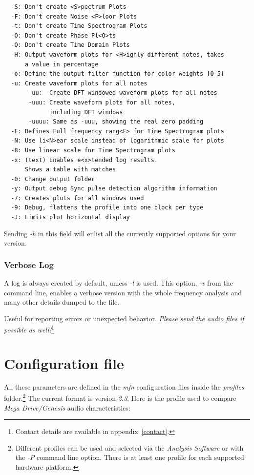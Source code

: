 \documentclass[10pt,a4paper]{report}
\begin{document}
\begin{appendices}
\begin{verbatim}
  -S: Don't create <S>pectrum Plots
  -F: Don't create Noise <F>loor Plots
  -t: Don't create Time Spectrogram Plots
  -O: Don't create Phase Pl<O>ts
  -Q: Don't create Time Domain Plots
  -H: Output waveform plots for <H>ighly different notes, takes
      a value in percentage
  -o: Define the output filter function for color weights [0-5]
  -u: Create waveform plots for all notes
       -uu:  Create DFT windowed waveform plots for all notes
       -uuu: Create waveform plots for all notes,
             including DFT windows
       -uuuu: Same as -uuu, showing the real zero padding
  -E: Defines Full frequency rang<E> for Time Spectrogram plots
  -N: Use li<N>ear scale instead of logarithmic scale for plots
  -8: Use linear scale for Time Spectrogram plots
  -x: (text) Enables e<x>tended log results.
      Shows a table with matches
  -0: Change output folder
  -y: Output debug Sync pulse detection algorithm information
  -7: Creates plots for all windows used
  -9: Debug, flattens the profile into one block per type
  -J: Limits plot horizontal display
\end{verbatim}

Sending \textit{-h} in this field will enlist all the currently supported options for your version.

\subsection{Verbose Log}
\label{verbose}

A log is always created by default, unless \textit{-l} is used. This option, \textit{-v} from the command line, enables a verbose version with the whole frequency analysis and many other details dumped to the file. 

Useful for reporting errors or unexpected behavior. \textit{Please send the audio files if possible as well!}\footnote{Contact details are available in appendix~\ref{contact}.}
	
\chapter{Configuration file}
\label{mfnconfig}

All these parameters are defined in the \textit{mfn} configuration files inside the \textit{profiles} folder.\footnote{Different profiles can be used and selected via the \textit{Analysis Software} or with the \textit{-P} command line option. There is at least one profile for each supported hardware platform.} The current format is version \textit{2.3}. Here is the profile used to compare \textit{Mega Drive/Genesis} audio characteristics:


\end{appendices}
\end{document}
